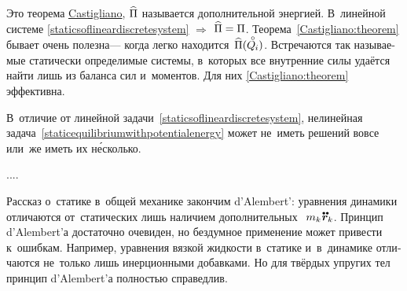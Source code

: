 \begin{otherlanguage}{russian}
\vspace{-0.1em}\noindent
Это теорема \href{https://en.wikipedia.org/wiki/Carlo_Alberto_Castigliano}{Castigliano}, $\widehat{\Pi}$ называется дополнительной энергией.
В~линейной системе \eqref{staticsoflineardiscretesystem} ${\Rightarrow}$ ${\widehat{\Pi} = \Pi}$.
Теорема~\eqref{Castigliano:theorem} бывает очень полезна\:--- когда легко находится~${\widehat{\potentialenergydensity}(\mathcircabove{Q}_{\hspace{-0.1ex}i})}$.
Встречаются так называемые статически определимые системы, в~которых все внутренние силы удаётся найти лишь из баланса сил и~моментов.
Для них \eqref{Castigliano:theorem} эффективна.

В~отличие от линейной задачи~\eqref{staticsoflineardiscretesystem}, нелинейная задача~\eqref{staticequilibriumwithpotentialenergy} может не~иметь решений вовсе или~же иметь их н\'{е}сколько.

....

Рассказ о~статике в~общей механике закончим  \hbox{d’\hspace{-0.2ex}Alembert’}:
уравнения динамики отличаются от~статических лишь наличием дополнительных ~${\hspace{-0.2ex}m_k \hspace{.1ex} \mathdotdotabove{\locationvector}_k}$.
Принцип \hbox{d’\hspace{-0.2ex}Alembert’а} достаточно очевиден, но бездумное применение может привести к~ошибкам.
Например, уравнения вязкой жидкости в~статике и~в~динамике отличаются не~только лишь инерционными добавками.
Но для твёрдых упругих тел принцип \hbox{d’\hspace{-0.2ex}Alembert’а} полностью справедлив.

\end{otherlanguage}



\label{section:mechanicsofrelativemotion}

